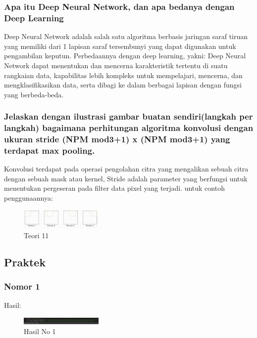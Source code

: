 \subsubsection{Apa itu Deep Neural Network, dan apa bedanya dengan Deep Learning}
\hfill\break
Deep Neural Network adalah salah satu algoritma berbasis jaringan saraf tiruan yang memiliki dari 1 lapisan saraf tersembunyi yang dapat digunakan untuk pengambilan keputun. Perbedaannya dengan deep learning, yakni: Deep Neural Network dapat menentukan dan mencerna karakteristik tertentu di suatu rangkaian data, kapabilitas lebih kompleks untuk mempelajari, mencerna, dan mengklasifikasikan data, serta dibagi ke dalam berbagai lapisan dengan fungsi yang berbeda-beda.

\subsubsection{Jelaskan dengan ilustrasi gambar buatan sendiri(langkah per langkah) bagaimana perhitungan algoritma konvolusi dengan ukuran stride (NPM mod3+1) x (NPM mod3+1) yang terdapat max pooling.}	
\hfill\break
Konvolusi terdapat pada operasi pengolahan citra yang mengalikan sebuah citra dengan sebuah mask atau kernel, Stride adalah parameter yang berfungsi untuk menentukan pergeseran pada filter data pixel yang terjadi. untuk contoh penggunaannya:
\begin{figure}[H]
\centering
	\includegraphics[width=4cm]{figures/1174057/chapter7/11.jpg}
\caption{Teori 11}
\end{figure}



\subsection{Praktek}
\subsubsection{Nomor 1}
\hfill\break

Hasil:
\begin{figure}[H]
\centering
	\includegraphics[width=4cm]{figures/1174057/chapter7/no1.jpg}
	\caption{Hasil No 1}
\end{figure}


